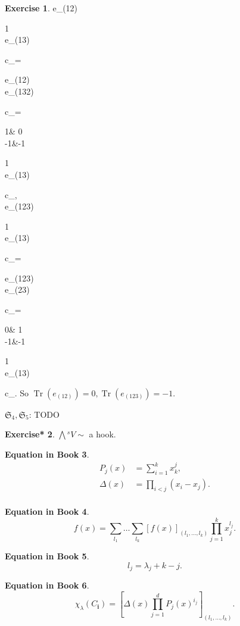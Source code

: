 \documentclass[12pt, letterpaper]{article}
\newcommand{\Tr}{\operatorname{Tr}}
\newcommand{\ext}[1]{\bigwedge\!^{#1}}
\newcommand{\red}[1]{{\color{red} #1}}
\newenvironment{eqlong}{\equation\aligned}{\endaligned\endequation}
\theoremstyle{definition}
\theoremstyle{remark}
\theoremstyle{definition}
\newtheorem{exe}{Exercise}[section]
\newtheorem{exe*}[exe]{Exercise*}
\newtheorem{eq}[exe]{Equation in Book}
\theoremstyle{plain}
\numberwithin{equation}{section}
\begin{document}
\begin{exe}
		\begin{eqlong}
			e_{(12)}
			\begin{pmatrix}
				1\\e_{(13)}
			\end{pmatrix}c_\lambda=
		\begin{pmatrix}
			e_{(12)}\\e_{(132)}
		\end{pmatrix}c_\lambda=
			\begin{pmatrix}
				1& 0\\
				-1&-1\\
			\end{pmatrix}
			\begin{pmatrix}
				1\\e_{(13)}
			\end{pmatrix}c_\lambda,\\
			e_{(123)}
			\begin{pmatrix}
				1\\e_{(13)}
			\end{pmatrix}c_\lambda=
		\begin{pmatrix}
		e_{(123)}\\e_{(23)}
	\end{pmatrix}c_\lambda=
			\begin{pmatrix}
				0& 1\\
				-1&-1\\
			\end{pmatrix}
			\begin{pmatrix}
				1\\e_{(13)}
			\end{pmatrix}c_\lambda.
		\end{eqlong}
		So $\Tr(e_{(12)})=0,\Tr(e_{(123)})=-1$.
		
		$\mathfrak{S}_4,\mathfrak{S}_5$: \red{TODO}
		
	\end{exe}	
	\begin{exe*}
		$\ext{s}V\sim$ a hook.
	\end{exe*}
	\begin{eq}
		\[
		\begin{aligned}
			P_j(x)&=\sum_{i=1}^{k}x_k^j,\\
			\Delta(x)&=\prod_{i<j}(x_i-x_j).\\
		\end{aligned}
		\]
	\end{eq}
	\begin{eq}
		\[f(x)=\sum_{l_1}\dots\sum_{l_k}[f(x)]_{(l_1,\dots,l_k)}\prod_{j=1}^{k}x_j^{l_j}
		.\]
	\end{eq}
	\begin{eq}
		\[l_j=\lambda_j+k-j.\]
	\end{eq}
	\begin{eq}
		\[\chi_\lambda(C_\mathbf{i})=\left[\Delta(x)\prod_{j=1}^dP_j(x)^{i_j}\right]_{(l_1,\dots,l_k)}.\]
	\end{eq}
\end{document}
